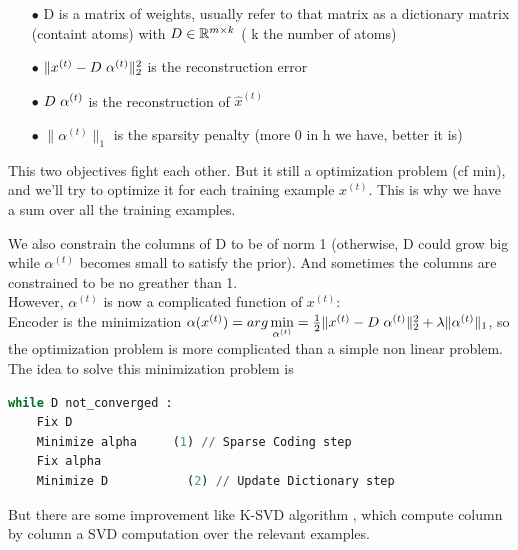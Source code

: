  \begin{itemize}
 \item[$\bullet$] D is a matrix of weights, usually refer to that matrix as a dictionary matrix (containt atoms) with $D \in  \mathbb{R}^{m \times k}$ ( k the number of atoms)
  \item[$\bullet$] $\| x^{(t)} - D \hspace{3px} \alpha^{(t)} \|_2^2 $ is the reconstruction error
  \item[$\bullet$]$ D \hspace{3px} \alpha^{(t)}$ is the reconstruction of $\hat{x}^{(t)}$
  \item[$\bullet$]$\|\alpha^{(t)} \|_1$ is the sparsity penalty (more 0 in h we have, better it is)
 \end{itemize}
This two objectives fight each other. But it still a optimization problem (cf min), and we'll try to optimize it for each training example $x^{(t)}$. This is why we have a sum over all the training examples.
\newline

\indent We also constrain the columns of D to be of norm 1 (otherwise, D could grow big while $\alpha^{(t)}$ becomes small to satisfy the prior). And sometimes the columns are constrained to be no greather than 1.\\

However, $\alpha^{(t)}$ is now a complicated function of $x^{(t)}$:\\
Encoder is the minimization $\alpha(x^{(t)}) = arg\min\limits_{\alpha^{(t)}}= \frac{1}{2} \| x^{(t)} - D \hspace{3px} \alpha^{(t)} \|_2^2 + \lambda \|\alpha^{(t)} \|_1$, so the optimization problem is more complicated than a simple non linear problem.\\
The idea to solve this minimization problem is \cite{NIPS2006_2979}

\begin{lstlisting}[language=Python,frame=single]
while D not_converged :
    Fix D
    Minimize alpha     (1) // Sparse Coding step
    Fix alpha
    Minimize D           (2) // Update Dictionary step
\end{lstlisting}

But there are some improvement like K-SVD algorithm \cite{KSVD}, which compute column by column a SVD computation over the relevant examples.
